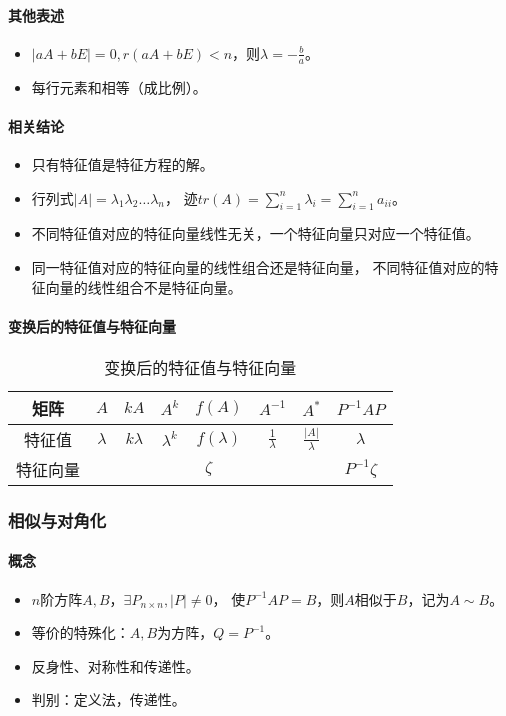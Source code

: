 \documentclass[
12pt, %
a4paper, 
oneside, %
headinclude,footinclude, %
]{scrartcl}
\begin{document}
\paragraph{其他表述}
\begin{itemize}
\item $ |aA + bE| = 0, r(aA + bE) < n $，则$ \lambda = -\frac{b}{a} $。
\item 每行元素和相等（成比例）。
\end{itemize}
\paragraph{相关结论}
\begin{itemize}
\item 只有特征值是特征方程的解。
\item 行列式$ |A| = \lambda_1 \lambda_2 \dots \lambda_n $，
迹$ tr(A) = \sum_{i = 1}^n \lambda_i = \sum_{i = 1}^n a_{ii} $。
\item 不同特征值对应的特征向量线性无关，一个特征向量只对应一个特征值。
\item 同一特征值对应的特征向量的线性组合还是特征向量，
不同特征值对应的特征向量的线性组合不是特征向量。
\end{itemize}
\paragraph{变换后的特征值与特征向量}
\begin{table}[hbt]
\caption{变换后的特征值与特征向量}
\centering
\begin{tabular}{|c|c|c|c|c|c|c|c|}
\hline
矩阵 & $ A $ & $ kA $ & $ A^k $ & $ f(A) $ & $ A^{-1} $ & $ A^* $ & $ P^{-1}AP $ \\
\hline
特征值 & $ \lambda $ & $ k\lambda $ & $ \lambda^k $ & $ f(\lambda) $ & $ \frac{1}{\lambda} $ & $ \frac{|A|}{\lambda} $ & $ \lambda $ \\
\hline
特征向量 & \multicolumn{6}{c|}{$ \zeta $} & $ P^{-1}\zeta $ \\
\hline
\end{tabular}
\end{table} 
\subsubsection[相似与对角化]{相似与对角化}
\paragraph{概念}
\begin{itemize}
\item $ n $阶方阵$ A,B $，$ \exists P_{n \times n}, |P| \neq 0 $，
使$ P^{-1}AP = B $，则$ A $相似于$ B $，记为$ A \sim B $。
\item 等价的特殊化：$ A,B $为方阵，$ Q = P^{-1} $。
\item 反身性、对称性和传递性。
\item 判别：定义法，传递性。
\end{itemize}
\end{document}
